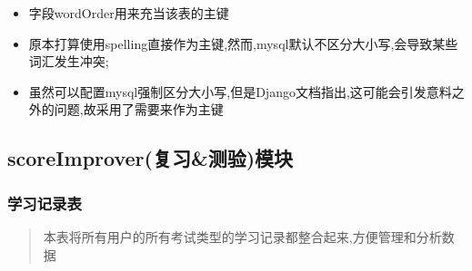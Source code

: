 \documentclass[
]{article}
\begin{document}
\begin{itemize}
\item
  字段wordOrder用来充当该表的主键
\item
  原本打算使用spelling直接作为主键,然而,mysql默认不区分大小写,会导致某些词汇发生冲突;
\item
  虽然可以配置mysql强制区分大小写,但是Django文档指出,这可能会引发意料之外的问题,故采用了需要来作为主键
\end{itemize}

\hypertarget{scoreimproverux590dux4e60ux6d4bux9a8cux6a21ux5757}{%
\subsection{scoreImprover(复习\&测验)模块}\label{scoreimproverux590dux4e60ux6d4bux9a8cux6a21ux5757}}

\hypertarget{ux5b66ux4e60ux8bb0ux5f55ux8868}{%
\subsubsection{学习记录表}\label{ux5b66ux4e60ux8bb0ux5f55ux8868}}

\begin{quote}
本表将所有用户的所有考试类型的学习记录都整合起来,方便管理和分析数据
\end{quote}
\end{document}
